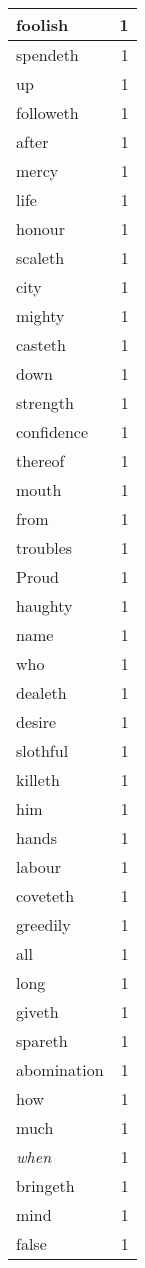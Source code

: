 \begin{center}
\begin{longtable}{l|r}
foolish & 1\\ \hline 
spendeth & 1\\ \hline 
up & 1\\ \hline 
followeth & 1\\ \hline 
after & 1\\ \hline 
mercy & 1\\ \hline 
life & 1\\ \hline 
honour & 1\\ \hline 
scaleth & 1\\ \hline 
city & 1\\ \hline 
mighty & 1\\ \hline 
casteth & 1\\ \hline 
down & 1\\ \hline 
strength & 1\\ \hline 
confidence & 1\\ \hline 
thereof & 1\\ \hline 
mouth & 1\\ \hline 
from & 1\\ \hline 
troubles & 1\\ \hline 
Proud & 1\\ \hline 
haughty & 1\\ \hline 
name & 1\\ \hline 
who & 1\\ \hline 
dealeth & 1\\ \hline 
desire & 1\\ \hline 
slothful & 1\\ \hline 
killeth & 1\\ \hline 
him & 1\\ \hline 
hands & 1\\ \hline 
labour & 1\\ \hline 
coveteth & 1\\ \hline 
greedily & 1\\ \hline 
all & 1\\ \hline 
long & 1\\ \hline 
giveth & 1\\ \hline 
spareth & 1\\ \hline 
abomination & 1\\ \hline 
how & 1\\ \hline 
much & 1\\ \hline 
\emph{when} & 1\\ \hline 
bringeth & 1\\ \hline 
mind & 1\\ \hline 
false & 1\\ \hline 

\end{longtable}
\end{center}
